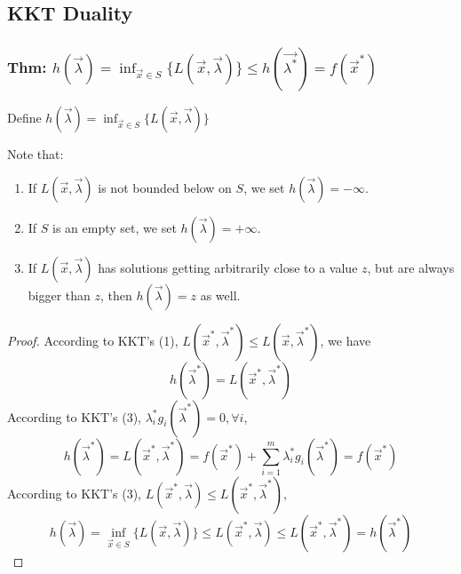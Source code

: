 \documentclass[11pt,a4paper]{article}
\newtheorem{theorem}{Theorem}
\begin{document}
\subsection{KKT Duality}

\subsubsection{Thm: $h(\vec{\lambda})=\inf_{\vec{x}\in S}\{L(\vec{x},\vec{\lambda})\}\leq h(\vec{\lambda^*})=f(\vec{x}^*)$}
Define $h(\vec{\lambda})=\inf_{\vec{x}\in S}\{L(\vec{x},\vec{\lambda})\}$

Note that:\begin{enumerate}[$\bullet$]
    \item If $L(\vec{x},\vec{\lambda})$ is not bounded below on $S$, we set $h(\vec{\lambda})=-\infty$.
    \item If $S$ is an empty set, we set $h(\vec{\lambda})=+\infty$.
    \item If $L(\vec{x},\vec{\lambda})$ has solutions getting arbitrarily close to a value $z$, but are always bigger than $z$, then $h(\vec{\lambda})=z$ as well.
\end{enumerate}

\begin{center}
\end{center}
\begin{proof}
    According to KKT's (1), $L(\vec{x}^*,\vec{\lambda}^*)\leq L(\vec{x},\vec{\lambda}^*)$, we have $$h(\vec{\lambda}^*)=L(\vec{x}^*,\vec{\lambda}^*)$$
    According to KKT's (3), $\lambda_i^* g_i(\vec{\lambda}^*)=0,\forall i$, $$h(\vec{\lambda}^*)=L(\vec{x}^*,\vec{\lambda}^*)=f(\vec{x}^*)+\sum_{i=1}^m\lambda_i^* g_i(\vec{\lambda}^*)=f(\vec{x}^*)$$
    According to KKT's (3), $L(\vec{x}^*,\vec{\lambda})\leq L(\vec{x}^*,\vec{\lambda}^*)$, $$h(\vec{\lambda})=\inf_{\vec{x}\in S}\{L(\vec{x},\vec{\lambda})\}\leq L(\vec{x}^*,\vec{\lambda})\leq L(\vec{x}^*,\vec{\lambda}^*)=h(\vec{\lambda}^*)$$
\end{proof}
\end{document}
